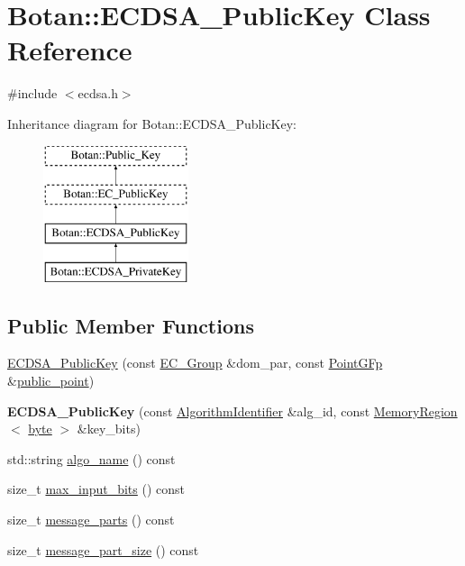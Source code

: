 \hypertarget{classBotan_1_1ECDSA__PublicKey}{\section{Botan\-:\-:E\-C\-D\-S\-A\-\_\-\-Public\-Key Class Reference}
\label{classBotan_1_1ECDSA__PublicKey}
}


{\ttfamily \#include $<$ecdsa.\-h$>$}

Inheritance diagram for Botan\-:\-:E\-C\-D\-S\-A\-\_\-\-Public\-Key\-:\begin{figure}[H]
\begin{center}
\leavevmode
\includegraphics[height=4.000000cm]{classBotan_1_1ECDSA__PublicKey}
\end{center}
\end{figure}
\subsection*{Public Member Functions}
\begin{DoxyCompactItemize}
\item 
\hyperlink{classBotan_1_1ECDSA__PublicKey_a848d139d38820ba2cdac58f4b4ad00a2}{E\-C\-D\-S\-A\-\_\-\-Public\-Key} (const \hyperlink{classBotan_1_1EC__Group}{E\-C\-\_\-\-Group} \&dom\-\_\-par, const \hyperlink{classBotan_1_1PointGFp}{Point\-G\-Fp} \&\hyperlink{classBotan_1_1EC__PublicKey_aaa811accdc280b77c1904bbbd819a1f7}{public\-\_\-point})
\item 
\hypertarget{classBotan_1_1ECDSA__PublicKey_aa4cf848525656f5f34cffe5dcd2765f2}{{\bfseries E\-C\-D\-S\-A\-\_\-\-Public\-Key} (const \hyperlink{classBotan_1_1AlgorithmIdentifier}{Algorithm\-Identifier} \&alg\-\_\-id, const \hyperlink{classBotan_1_1MemoryRegion}{Memory\-Region}$<$ \hyperlink{namespaceBotan_a7d793989d801281df48c6b19616b8b84}{byte} $>$ \&key\-\_\-bits)}\label{classBotan_1_1ECDSA__PublicKey_aa4cf848525656f5f34cffe5dcd2765f2}

\item 
std\-::string \hyperlink{classBotan_1_1ECDSA__PublicKey_a2daec84d56768c5e8212fbe1e95c6b83}{algo\-\_\-name} () const 
\item 
size\-\_\-t \hyperlink{classBotan_1_1ECDSA__PublicKey_a79a1fc6a7b03add5e53d021961455f97}{max\-\_\-input\-\_\-bits} () const 
\item 
size\-\_\-t \hyperlink{classBotan_1_1ECDSA__PublicKey_ad5d7013b1d2db4341a286abcdbaf30f7}{message\-\_\-parts} () const 
\item 
size\-\_\-t \hyperlink{classBotan_1_1ECDSA__PublicKey_ab5bd7738d3f88373282c3cd35ed68290}{message\-\_\-part\-\_\-size} () const 
\end{DoxyCompactItemize}
